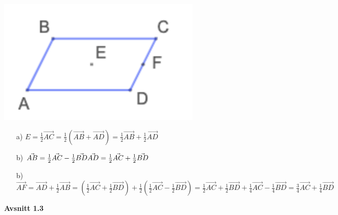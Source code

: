 \documentclass{article}
\begin{document}
\subsection{}
\includegraphics[scale=0.6]{uppg1_3}
\begin{enumerate}
    \item[a)]
        \begin{math}
            E
            =\frac{1}{2}\vec{AC}
            =\frac{1}{2}(\vec{AB}+\vec{AD})
            =\frac{1}{2}\vec{AB}+\frac{1}{2}\vec{AD}
        \end{math}
    \item[b)]
        \begin{math}
            \vec{AB}
            =\frac{1}{2}\vec{AC}-\frac{1}{2}\vec{BD}
            \\
            \vec{AD}
            =\frac{1}{2}\vec{AC}+\frac{1}{2}\vec{BD}
        \end{math}
    \item[b)]
        \begin{math}
            \vec{AF}
            =\vec{AD}+\frac{1}{2}\vec{AB}
            =(\frac{1}{2}\vec{AC}+\frac{1}{2}\vec{BD})+\frac{1}{2}(\frac{1}{2}\vec{AC}-\frac{1}{2}\vec{BD})
            =\frac{1}{2}\vec{AC}+\frac{1}{2}\vec{BD}+\frac{1}{4}\vec{AC}-\frac{1}{4}\vec{BD}
            =\frac{3}{4}\vec{AC}+\frac{1}{4}\vec{BD}
        \end{math}
\end{enumerate}
\textbf{Avsnitt 1.3}
\end{document}
